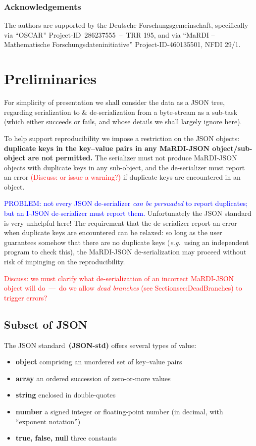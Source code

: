 \documentclass{article}
\newcommand{\MaRDIJSON}{MaRDI-JSON}
\newcommand \eg {\textit{e.g.}}
\def\red#1{\textcolor{red}{#1}}
\def\blue#1{\textcolor{blue}{#1}}
\begin{document}
\subsubsection*{Acknowledgements}

The authors are supported by the Deutsche Forschungsgemeinschaft,
specifically via ``OSCAR'' Project-ID~286237555~--~TRR 195, and via ``MaRDI – Mathematische Forschungsdateninitiative'' Project-ID-460135501, NFDI 29/1.


\section{Preliminaries}
\label{sec:prelim}

For simplicity of presentation we shall consider the data as a JSON
tree, regarding serialization to {\&} de-serialization from a
byte-stream as a sub-task (which either succeeds or fails, and whose
details we shall largely ignore here).

To help support reproducibility we impose a restriction on the JSON
objects: \textbf{duplicate keys in the key--value pairs in any
  {\MaRDIJSON} object/sub-object are not permitted.}  The serializer
must not produce {\MaRDIJSON} objects with duplicate keys in any
sub-object, and the de-serializer must report an error \red{(Discuss: or issue
  a warning?)} if duplicate keys are encountered in an object.

\blue{PROBLEM: not every JSON de-serializer \textit{can be persuaded}
  to report duplicates; but an I-JSON de-serializer must report them.}
Unfortunately the JSON standard is very unhelpful here!  The
requirement that the de-serializer report an error when duplicate keys
are encountered can be relaxed: so long as the user guarantees somehow
that there are no duplicate keys (\eg~using an independent program to
check this), the {\MaRDIJSON} de-serialization may proceed without
risk of impinging on the reproducibility.

\red{Discuss: we must clarify what de-serialization of an incorrect {\MaRDIJSON} object will do~---~do we allow \textit{dead branches} (see Section{sec:DeadBranches}) to trigger errors?}


\subsection{Subset of JSON}

The JSON standard~\textbf{(JSON-std)} offers several types of value:
\begin{itemize}
\setlength{\itemsep}{-3pt}
\item \textbf{object} comprising an unordered set of key--value pairs
\item \textbf{array} an ordered succession of zero-or-more values
\item \textbf{string} enclosed in double-quotes
\item \textbf{number} a signed integer or floating-point number (in decimal, with ``exponent notation'')
\item \textbf{true, false, null} three constants
\end{itemize}
\end{document}
